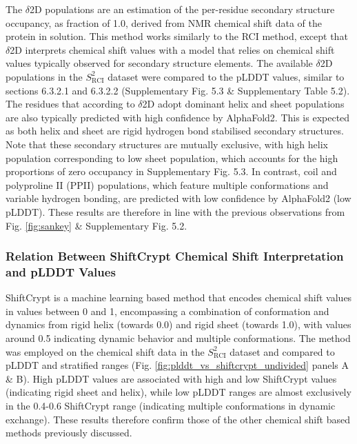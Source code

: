 The $\delta$2D populations \cite{camilloni_determination_2012} are an estimation of the per-residue secondary structure occupancy, as fraction of 1.0, derived from NMR chemical shift data of the protein in solution. This method works similarly to the RCI method, except that $\delta$2D interprets chemical shift values with a model that relies on chemical shift values typically observed for secondary structure elements. The available $\delta$2D populations in the $S^{2}_{\text{RCI}}$ dataset were compared to the pLDDT values, similar to sections 6.3.2.1 and 6.3.2.2 (Supplementary Fig. 5.3 \& Supplementary Table 5.2).
The residues that according to $\delta$2D adopt dominant helix and sheet populations are also typically predicted with high confidence by AlphaFold2. This is expected as both helix and sheet are rigid hydrogen bond stabilised secondary structures. Note that these secondary structures are mutually exclusive, with high helix population corresponding to low sheet population, which accounts for the high proportions of zero occupancy in Supplementary Fig. 5.3.
In contrast, coil and polyproline II (PPII) populations, which feature multiple conformations and variable hydrogen bonding, are predicted with low confidence by AlphaFold2 (low pLDDT). These results are therefore in line with the previous observations from Fig. \ref{fig:sankey} \& Supplementary Fig. 5.2.

\subsubsection{Relation Between ShiftCrypt Chemical Shift Interpretation and pLDDT Values}

ShiftCrypt \cite{orlando_shiftcrypt_2020} is a machine learning based method that encodes chemical shift values in values between 0 and 1, encompassing a combination of conformation and dynamics from rigid helix (towards 0.0) and rigid sheet (towards 1.0), with values around 0.5 indicating dynamic behavior and multiple conformations. The method was employed on the chemical shift data in the $S^{2}_{\text{RCI}}$ dataset and compared to pLDDT and stratified ranges (Fig. \ref{fig:plddt_vs_shiftcrypt_undivided} panels A \& B). High pLDDT values are associated with high and low ShiftCrypt values (indicating rigid sheet and helix), while low pLDDT ranges are almost exclusively in the 0.4-0.6 ShiftCrypt range (indicating multiple conformations in dynamic exchange). These results therefore confirm those of the other chemical shift based methods previously discussed.


